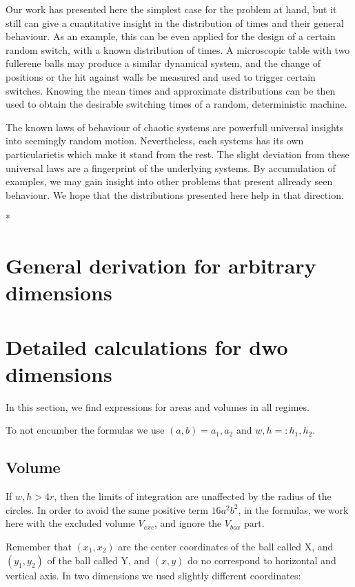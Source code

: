 \documentclass[superscriptaddress,pre,reprint,showpacs,twocolumn]{revtex4-1}
\begin{document}
Our work has presented here the simplest case for the problem at hand, but it still
can give a cuantitative insight in the distribution of times and their
general behaviour. As an example, this can be even applied for the design of a certain
random switch, with a known distribution of times. A microscopic table with two
fullerene balls may produce a similar dynamical system, and the change of positions
or the hit against walls be measured and used to trigger certain switches. 
Knowing the mean times and approximate distributions can be then used
to obtain the desirable switching times of a random, deterministic machine.

The known laws of behaviour of chaotic systems are powerfull universal insights
into seemingly random motion. Nevertheless, each systems has its own
particularietis which make it stand from the rest. The slight deviation from
these universal laws are a fingerprint of the underlying systems. By
accumulation of examples, we may gain insight into other problems that
present allready seen behaviour. We hope that the distributions presented here
help in that direction. 

*\appendix

\section{General derivation for arbitrary dimensions}
\label{app:area_volumeNd}

\section{Detailed calculations for dwo dimensions}
\label{app:area_volume2d}

In this section, we find expressions for areas and volumes in all 
regimes.

To not encumber  the formulas we use  $(a , b)  = a_1 , a_2 $
and $w,h =: h_1, h_2 $.


\subsection{Volume}\label{app:volume2d}


If $w, h > 4r$, then the limits of integration
are unaffected by the radius of the circles.
In order to avoid the same positive term $16a^2b^2$, 
in the formulas, we work here with
the excluded volume $V_{exc}$, and ignore the  $V_{box}$ part.

Remember that $(x_1, x_2)$ are the center coordinates of the
ball called X, and $(y_1, y_2)$ of the ball called Y,
and $(x,y)$  do no correspond to horizontal and vertical axis.
In two dimensions we used slightly different coordinates:
\end{document}
